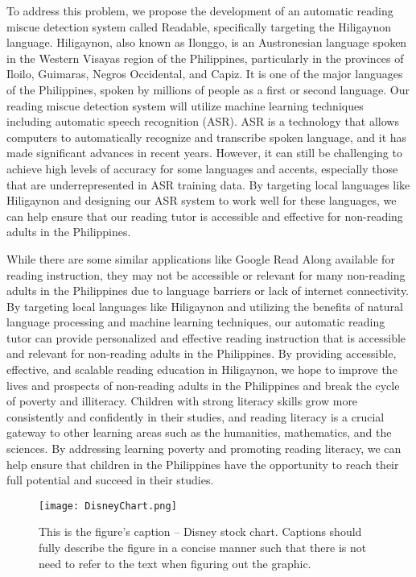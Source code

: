 To address this problem, we propose the development of an automatic reading miscue detection system called Readable, specifically targeting the Hiligaynon language. Hiligaynon, also known as Ilonggo, is an Austronesian language spoken in the Western Visayas region of the Philippines, particularly in the provinces of Iloilo, Guimaras, Negros Occidental, and Capiz. It is one of the major languages of the Philippines, spoken by millions of people as a first or second language.
Our reading miscue detection system will utilize machine learning techniques including automatic speech recognition (ASR). ASR is a technology that allows computers to automatically recognize and transcribe spoken language, and it has made significant advances in recent years. However, it can still be challenging to achieve high levels of accuracy for some languages and accents, especially those that are underrepresented in ASR training data. By targeting local languages like Hiligaynon and designing our ASR system to work well for these languages, we can help ensure that our reading tutor is accessible and effective for non-reading adults in the Philippines.

While there are some similar applications like Google Read Along available for reading instruction, they may not be accessible or relevant for many non-reading adults in the Philippines due to language barriers or lack of internet connectivity. By targeting local languages like Hiligaynon and utilizing the benefits of natural language processing and machine learning techniques, our automatic reading tutor can provide personalized and effective reading instruction that is accessible and relevant for non-reading adults in the Philippines. By providing accessible, effective, and scalable reading education in Hiligaynon, we hope to improve the lives and prospects of non-reading adults in the Philippines and break the cycle of poverty and illiteracy. Children with strong literacy skills grow more consistently and confidently in their studies, and reading literacy is a crucial gateway to other learning areas such as the humanities, mathematics, and the sciences. By addressing learning poverty and promoting reading literacy, we can help ensure that children in the Philippines have the opportunity to reach their full potential and succeed in their studies.

  
\begin{figure}[t]                %
   \centering                    %
   \texttt{[image: DisneyChart.png]}      %
   \caption{This is the figure's caption -- Disney stock chart.
   	Captions should fully describe the figure in a concise manner  such that there is not need to refer to the text when figuring out the graphic.}
    \label{fig:disneystock}
\end{figure}


